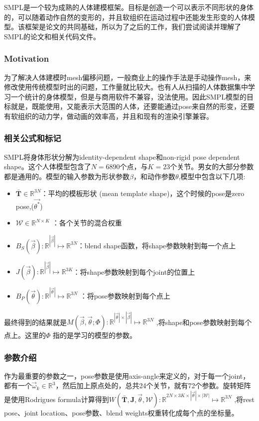 \documentclass{article}
\begin{document}
SMPL\cite{smpl,smplhomepage}是一个较为成熟的人体建模框架。目标是创造一个可以表示不同形状的身体的，可以随着动作自然的变形的，并且软组织在运动过程中还能发生形变的人体模型。该框架是论文\cite{paper1,paper2}的共同基础，所以为了之后的工作，我们尝试阅读并理解了SMPL的论文和相关代码文件。
\subsubsection{Motivation}
为了解决人体建模时mesh偏移问题，一般商业上的操作手法是手动操作mesh，来修改使用传统模型时出的问题，工作量就比较大。也有人从扫描的人体数据集中学习一个统计的身体模型，但是与商用软件不兼容，没法使用。因此SMPL模型的目标就是，既能使用，又能表示大范围的人体，还要能通过pose来自然的形变，还要有软组织的动力学，做动画的效率高，并且和现有的渲染引擎兼容。

\subsubsection{相关公式和标记}
SMPL将身体形状分解为identity-dependent shape和non-rigid pose dependent shape。这个人体模型包含了$N=6890$个点，与$K=23$个关节。男女的大部分参数都是通用的。模型的输入参数为形状参数$\beta$，和动作参数$\theta$,模型中包含以下几项:
\begin{itemize}
	\item $\bar{\textbf{T}} \in \mathbb{R}^{3N}$：平均的模板形状 (mean template shape)，这个时候的pose是zero pose,($\vec{\theta^*}$)
	\item $\mathcal{W}\in \mathbb{R}^{N\times K}$ ：各个关节的混合权重
	\item $B_S(\vec{\beta}):\mathbb{R}^{|\vec{\beta}|} \mapsto \mathbb{R}^{3N}$：blend shape函数，将shape参数映射到每一个点上
	\item $J(\vec{\beta}):\mathbb{R}^{|\vec{\beta}|} \mapsto \mathbb{R}^{3K}$：将shape参数映射到每个joint的位置上
	\item $B_P(\vec{\theta}):\mathbb{R}^{|\vec{\theta}|} \mapsto \mathbb{R}^{3N}$ ：将pose参数映射到每个点上
\end{itemize}

最终得到的结果就是$M(\vec{\beta},\vec{\theta};\Phi):\mathbb{R}^{|\vec{\theta}|\times |\vec{\beta}|} \mapsto \mathbb{R}^{3N}$ ,将shape和pose参数映射到每个点上。这里的$\Phi$ 指的是学习的模型的参数。

\subsubsection{参数介绍}
作为最重要的参数之一，pose参数是使用axis-angle来定义的，对于每一个joint，都有一个$\vec{\omega}_k\in \mathbb{R}^3$，然后加上原点处的，总共24个关节，就有72个参数。旋转矩阵是使用Rodrigues formula计算得到$W(\bar{\mathbf{T}},\mathbf{J},\vec{\theta},\mathcal{W}):\mathbb{R}^{2N\times 3K\times|\vec{\theta}|\times |\mathcal{W}|} \mapsto \mathbb{R}^{3N}$ ,将rest pose、joint location、pose参数、blend weights权重转化成每个点的坐标量。
\end{document}
